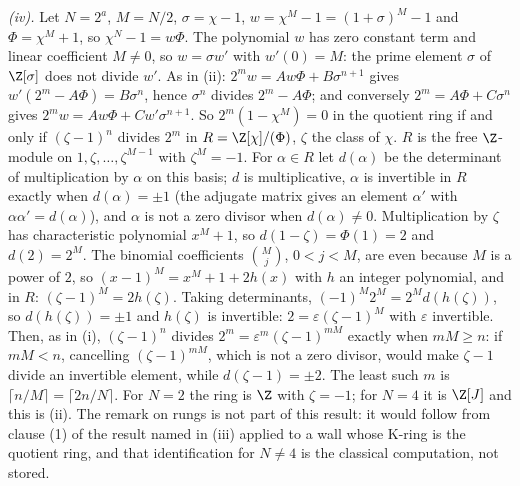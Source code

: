 \emph{(iv).} Let $N = 2^{a}$, $M = N/2$, $\sigma = \chi - 1$, $w = \chi^{M} - 1 = (1 + \sigma)^{M} - 1$ and $\Phi = \chi^{M} + 1$, so $\chi^{N} - 1 = w\Phi$. The polynomial $w$ has zero constant term and linear coefficient $M \ne 0$, so $w = \sigma w'$ with $w'(0) = M$: the prime element $\sigma$ of $\Z[\sigma]$ does not divide $w'$. As in (ii): $2^{m}w = Aw\Phi + B\sigma^{n+1}$ gives $w'(2^{m} - A\Phi) = B\sigma^{n}$, hence $\sigma^{n}$ divides $2^{m} - A\Phi$; and conversely $2^{m} = A\Phi + C\sigma^{n}$ gives $2^{m}w = Aw\Phi + Cw'\sigma^{n+1}$. So $2^{m}(1 - \chi^{M}) = 0$ in the quotient ring if and only if $(\zeta - 1)^{n}$ divides $2^{m}$ in $R = \Z[\chi]/(\Phi)$, $\zeta$ the class of $\chi$. $R$ is the free $\Z$-module on $1, \zeta, \dots, \zeta^{M-1}$ with $\zeta^{M} = -1$. For $\alpha \in R$ let $d(\alpha)$ be the determinant of multiplication by $\alpha$ on this basis; $d$ is multiplicative, $\alpha$ is invertible in $R$ exactly when $d(\alpha) = \pm 1$ (the adjugate matrix gives an element $\alpha'$ with $\alpha\alpha' = d(\alpha)$), and $\alpha$ is not a zero divisor when $d(\alpha) \ne 0$. Multiplication by $\zeta$ has characteristic polynomial $x^{M} + 1$, so $d(1 - \zeta) = \Phi(1) = 2$ and $d(2) = 2^{M}$. The binomial coefficients $\binom{M}{j}$, $0 < j < M$, are even because $M$ is a power of $2$, so $(x - 1)^{M} = x^{M} + 1 + 2h(x)$ with $h$ an integer polynomial, and in $R$: $(\zeta - 1)^{M} = 2h(\zeta)$. Taking determinants, $(-1)^{M}2^{M} = 2^{M}d(h(\zeta))$, so $d(h(\zeta)) = \pm 1$ and $h(\zeta)$ is invertible: $2 = \varepsilon(\zeta - 1)^{M}$ with $\varepsilon$ invertible. Then, as in (i), $(\zeta - 1)^{n}$ divides $2^{m} = \varepsilon^{m}(\zeta - 1)^{mM}$ exactly when $mM \ge n$: if $mM < n$, cancelling $(\zeta - 1)^{mM}$, which is not a zero divisor, would make $\zeta - 1$ divide an invertible element, while $d(\zeta - 1) = \pm 2$. The least such $m$ is $\lceil n/M \rceil = \lceil 2n/N \rceil$. For $N = 2$ the ring is $\Z$ with $\zeta = -1$; for $N = 4$ it is $\Z[J]$ and this is (ii). The remark on rungs is not part of this result: it would follow from clause (1) of the result named in (iii) applied to a wall whose K-ring is the quotient ring, and that identification for $N \ne 4$ is the classical computation, not stored.
